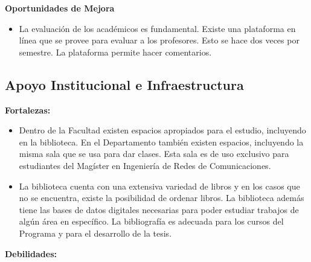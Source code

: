 \noindent\textbf{Oportunidades de Mejora}

\begin{itemize}
\item La evaluación de los académicos es fundamental. Existe una plataforma en línea que se provee para evaluar a los profesores. 
Esto se hace dos veces por semestre. La plataforma permite hacer comentarios.
\end{itemize}



\subsection{Apoyo Institucional e Infraestructura}

\noindent\textbf{Fortalezas:}

\begin{itemize}
\item Dentro de la Facultad existen espacios apropiados para el estudio, incluyendo en la biblioteca. En el Departamento
también existen espacios, incluyendo la misma sala que se usa para dar clases. Esta sala es de uso exclusivo para estudiantes
del Magíster en Ingeniería de Redes de Comunicaciones.
\item La biblioteca cuenta con una extensiva variedad de libros y en los casos que no se encuentra, existe la posibilidad 
de ordenar libros. La biblioteca además tiene las bases de datos digitales necesarias para poder estudiar trabajos de algún área 
en específico. La bibliografía es adecuada para los cursos del Programa y para el desarrollo de la tesis.
\end{itemize}

\noindent\textbf{Debilidades:}

